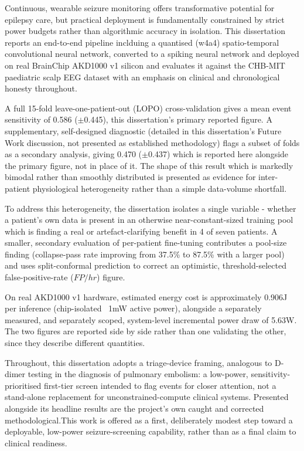 Continuous, wearable seizure monitoring offers transformative potential for epilepsy care, but practical deployment is fundamentally 
constrained by strict power budgets rather than algorithmic accuracy in isolation. This dissertation reports an end-to-end pipeline inclduing a quantised
(w4a4) spatio-temporal convolutional neural network, converted to a spiking neural network and deployed on real BrainChip AKD1000 v1 silicon and
evaluates it against the CHB-MIT 
paediatric scalp EEG dataset \citep{goldberger2000} with an emphasis on clinical and chronological honesty throughout.

A full 15-fold leave-one-patient-out (LOPO) cross-validation gives a mean event sensitivity of 0.586 ($\pm$0.445), this dissertation's primary reported figure. A supplementary, self-designed diagnostic (detailed in this dissertation's Future Work discussion, not presented as established methodology) flags a subset of folds as a secondary analysis, giving 0.470 ($\pm$0.437) which is reported here alongside the primary figure, not in place of it. The shape of this result which is markedly bimodal rather than smoothly distributed is presented as evidence for inter-patient physiological heterogeneity rather than a simple data-volume shortfall.


To address this heterogeneity, the dissertation isolates a single variable - whether a patient's own data is present in an otherwise 
near-constant-sized training pool which is finding a real or artefact-clarifying benefit in 4 of seven patients.
A smaller, secondary evaluation of per-patient fine-tuning contributes a pool-size finding
(collapse-pass rate improving from 37.5\% to 87.5\% with a larger pool) and uses split-conformal prediction to correct an optimistic, 
threshold-selected false-positive-rate ($FP/hr$) figure. 


On real AKD1000 v1 hardware, estimated energy cost is approximately 0.906\textmu J per inference (chip-isolated ~1mW active power), alongside 
a separately measured, and separately scoped, system-level incremental power draw of 5.63W. The two figures are reported side by side rather 
than one validating the other, since they describe different quantities.


Throughout, this dissertation adopts a triage-device framing, analogous to D-dimer testing in the diagnosis of pulmonary embolism: a low-power, 
sensitivity-prioritised first-tier screen intended to flag events for closer attention, not a stand-alone replacement for unconstrained-compute 
clinical systems. Presented alongside its headline results are the project's own 
caught and corrected methodological.This work is offered as a first, deliberately 
modest step toward a deployable, low-power seizure-screening capability, rather than as a final claim to clinical readiness.
